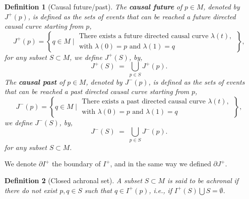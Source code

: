 \documentclass[10pt]{book}
\theoremstyle{break}
\newtheorem{definition}{Definition}
\begin{document}
\begin{definition}[Causal future/past] 
The \textbf{causal future} of $p \in M$, denoted by $J^{+}(p)$, is defined as the sets of events that can be reached a future directed causal curve starting from $p$,
\begin{equation*}
J^{+}(p) = \left\{ q \in M \; \bigg| \; \begin{array}{l} \text{There exists a future directed causal curve $\lambda(t)$,} \\ \text{with $\lambda(0)=p$ and $\lambda(1)=q$} \end{array} \; \right\},
\end{equation*}
for any subset $S \subset M$, we define $J^{+}(S)$, by,
\begin{equation*}
J^{+}(S) \; = \; \bigcup_{p \in S} J^{+}(p). 
\end{equation*}
The \textbf{causal past} of $p \in M$, denoted by $J^{-}(p)$, is defined as the sets of events that can be reached a past directed causal curve starting from $p$,
\begin{equation*}
J^{-}(p) = \left\{ q \in M \; \bigg| \; \begin{array}{l} \text{There exists a past directed causal curve $\lambda(t)$,} \\ \text{with $\lambda(0)=p$ and $\lambda(1)=q$} \end{array} \; \right\},
\end{equation*}
we define $J^{-}(S)$, by,
\begin{equation*}
J^{-}(S) \; = \; \bigcup_{p \in S} J^{-}(p). 
\end{equation*}
for any subset $S \subset M$. 
\end{definition}

We denote $\partial I^{+}$ the boundary of $I^+$, and in the same way we defined $\partial J^+$.

\begin{definition}[Closed achronal set]
A subset $S \subset M$ is said to be achronal if there do not exist $p, q \in S$ such that $q \in I^{+}(p)$, i.e., if $I^{+}(S) \bigcup S = \emptyset$. 
\end{definition}
\end{document}

